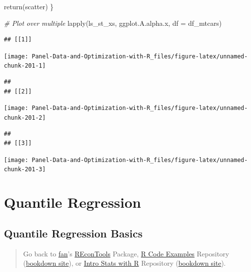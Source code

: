 \documentclass[
]{book}
\newenvironment{Shaded}{\begin{snugshade}}{\end{snugshade}}
\newcommand{\AttributeTok}[1]{\textcolor[rgb]{0.77,0.63,0.00}{#1}}
\newcommand{\CommentTok}[1]{\textcolor[rgb]{0.56,0.35,0.01}{\textit{#1}}}
\newcommand{\FunctionTok}[1]{\textcolor[rgb]{0.00,0.00,0.00}{#1}}
\newcommand{\NormalTok}[1]{#1}
\begin{document}
\begin{Shaded}
\begin{Highlighting}[]
\FunctionTok{return}\NormalTok{(scatter)}
\NormalTok{\}}

\CommentTok{\# Plot over multiple}
\FunctionTok{lapply}\NormalTok{(ls\_st\_xs,}
\NormalTok{       ggplot.A.alpha.x,}
       \AttributeTok{df =}\NormalTok{ df\_mtcars)}
\end{Highlighting}
\end{Shaded}

\begin{verbatim}
## [[1]]
\end{verbatim}

\begin{center}\texttt{[image: Panel-Data-and-Optimization-with-R\_files/figure-latex/unnamed-chunk-201-1]} \end{center}

\begin{verbatim}
## 
## [[2]]
\end{verbatim}

\begin{center}\texttt{[image: Panel-Data-and-Optimization-with-R\_files/figure-latex/unnamed-chunk-201-2]} \end{center}

\begin{verbatim}
## 
## [[3]]
\end{verbatim}

\begin{center}\texttt{[image: Panel-Data-and-Optimization-with-R\_files/figure-latex/unnamed-chunk-201-3]} \end{center}

\hypertarget{quantile-regression}{%
\section{Quantile Regression}\label{quantile-regression}}

\hypertarget{quantile-regression-basics}{%
\subsection{Quantile Regression Basics}\label{quantile-regression-basics}}

\begin{quote}
Go back to \href{http://fanwangecon.github.io/}{fan}'s \href{https://fanwangecon.github.io/REconTools/}{REconTools} Package, \href{https://fanwangecon.github.io/R4Econ/}{R Code Examples} Repository (\href{https://fanwangecon.github.io/R4Econ/bookdown}{bookdown site}), or \href{https://fanwangecon.github.io/Stat4Econ/}{Intro Stats with R} Repository (\href{https://fanwangecon.github.io/Stat4Econ/bookdown}{bookdown site}).
\end{quote}
\end{document}
